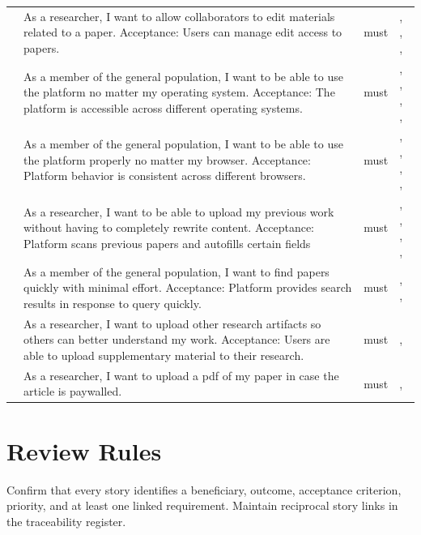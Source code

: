 \begin{tabularx}{\linewidth}{L{1.9cm}YL{1.8cm}L{3.4cm}}
 &
As a researcher, I want to allow collaborators to edit materials related to a paper. Acceptance: Users can manage edit access to papers. &
\gls{must} &
,    , ,  \\ 

 &
As a member of the general population, I want to be able to use the platform no matter my operating system. Acceptance: The platform is accessible across different operating systems. &
\gls{must} &
,    , , ,    \\

 &
As a member of the general population, I want to be able to use the platform properly no matter my browser. Acceptance: Platform behavior is consistent across different browsers. &
\gls{must} &
,    , , ,    \\

 &
As a researcher, I want to be able to upload my previous work without having to completely rewrite content. Acceptance: Platform scans previous papers and autofills certain fields &
\gls{must} &
,    , , ,    \\

 &
As a member of the general population, I want to find papers quickly with minimal effort. Acceptance: Platform provides search results in response to query quickly. & \gls{must} & , , \\

 &
As a researcher, I want to upload other research artifacts so others can better understand my work. Acceptance: Users are able to upload supplementary material to their research. & \gls{must} & ,  \\

 &
As a researcher, I want to upload a pdf of my paper in case the article is paywalled. & \gls{must} & , \\

\end{tabularx}

\section{Review Rules}
Confirm that every story identifies a beneficiary, outcome, acceptance
criterion, priority, and at least one linked requirement. Maintain reciprocal
story links in the traceability register.
